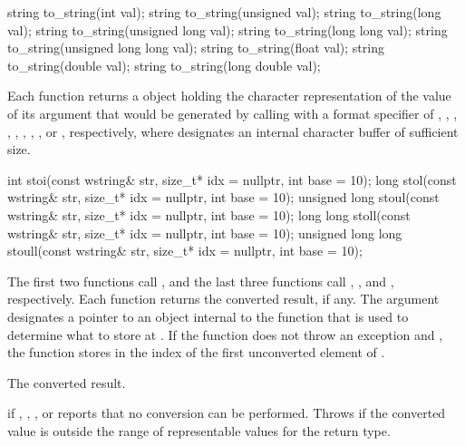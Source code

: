 %
\begin{itemdecl}
string to_string(int val);
string to_string(unsigned val);
string to_string(long val);
string to_string(unsigned long val);
string to_string(long long val);
string to_string(unsigned long long val);
string to_string(float val);
string to_string(double val);
string to_string(long double val);
\end{itemdecl}

\begin{itemdescr}
\pnum
\returns
Each function returns a  object holding the character
representation of the value of its argument that would be generated by calling
 with a format specifier of
,
,
,
,
,  ,
,
,
or , respectively, where  designates an internal
character buffer of sufficient size.
\end{itemdescr}

%
%
%
%
%
\begin{itemdecl}
int stoi(const wstring& str, size_t* idx = nullptr, int base = 10);
long stol(const wstring& str, size_t* idx = nullptr, int base = 10);
unsigned long stoul(const wstring& str, size_t* idx = nullptr, int base = 10);
long long stoll(const wstring& str, size_t* idx = nullptr, int base = 10);
unsigned long long stoull(const wstring& str, size_t* idx = nullptr, int base = 10);
\end{itemdecl}

\begin{itemdescr}
\pnum
\effects
The first two functions call ,
and the last three functions call ,
, and , respectively. Each function returns the converted result, if any. The
argument  designates a pointer to an object internal to the function
that is used to determine what to store at . If the function does
not throw an exception and , the function stores in 
the index of the first unconverted element of .

\pnum
\returns
The converted result.

\pnum
\throws
{} if , , , or
 reports that no conversion can be performed. Throws
 if the converted value is outside the range of representable values
for the return type.
\end{itemdescr}

